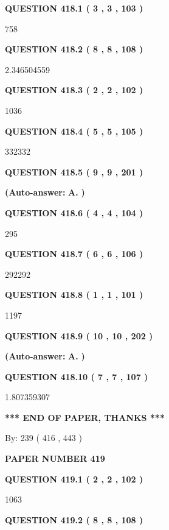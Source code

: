 \documentclass{ctexart}
\begin{document}
   
   
   
  
  
{\textbf{\large{QUESTION
418.1 
 ( 3 , 3 , 103 )
}}}

758
  
  
{\textbf{\large{QUESTION
418.2 
 ( 8 , 8 , 108 )
}}}

2.346504559
  
  
{\textbf{\large{QUESTION
418.3 
 ( 2 , 2 , 102 )
}}}

1036
  
  
{\textbf{\large{QUESTION
418.4 
 ( 5 , 5 , 105 )
}}}

332332
  
  
{\textbf{\large{QUESTION
418.5 
 ( 9 , 9 , 201 )
}}}
 
 
{\textbf{(Auto-answer:}}
{\textbf{\large{
A.}}}
{\textbf{)}}
 
 
  
  
{\textbf{\large{QUESTION
418.6 
 ( 4 , 4 , 104 )
}}}

295
  
  
{\textbf{\large{QUESTION
418.7 
 ( 6 , 6 , 106 )
}}}

292292
  
  
{\textbf{\large{QUESTION
418.8 
 ( 1 , 1 , 101 )
}}}

1197
  
  
{\textbf{\large{QUESTION
418.9 
 ( 10 , 10 , 202 )
}}}
 
 
{\textbf{(Auto-answer:}}
{\textbf{\large{
A.}}}
{\textbf{)}}
 
 
  
  
{\textbf{\large{QUESTION
418.10 
 ( 7 , 7 , 107 )
}}}

1.807359307
   
   
   
   
\vspace{1.0in} 
{\textbf{\large{ *** END OF PAPER, THANKS *** }}} 
   
   
\hspace{1.0in} By: 
 239 ( 416 ,  443 )
   
   
   
   
\newpage 
\setcounter{page}{ 
   419001 } 
   
   
 {\textbf{ \Large{ PAPER NUMBER  419  }}}
   
   
   
   
  
  
{\textbf{\large{QUESTION
419.1 
 ( 2 , 2 , 102 )
}}}

1063
  
  
{\textbf{\large{QUESTION
419.2 
 ( 8 , 8 , 108 )
}}}
\end{document}
